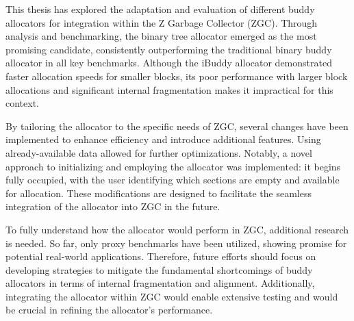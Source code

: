 This thesis has explored the adaptation and evaluation of different buddy allocators for integration within the Z Garbage Collector (ZGC). Through analysis and benchmarking, the binary tree allocator emerged as the most promising candidate, consistently outperforming the traditional binary buddy allocator in all key benchmarks. Although the iBuddy allocator demonstrated faster allocation speeds for smaller blocks, its poor performance with larger block allocations and significant internal fragmentation makes it impractical for this context.

By tailoring the allocator to the specific needs of ZGC, several changes have been implemented to enhance efficiency and introduce additional features. Using already-available data allowed for further optimizations. Notably, a novel approach to initializing and employing the allocator was implemented: it begins fully occupied, with the user identifying which sections are empty and available for allocation. These modifications are designed to facilitate the seamless integration of the allocator into ZGC in the future.

To fully understand how the allocator would perform in ZGC, additional research is needed. So far, only proxy benchmarks have been utilized, showing promise for potential real-world applications. Therefore, future efforts should focus on developing strategies to mitigate the fundamental shortcomings of buddy allocators in terms of internal fragmentation and alignment. Additionally, integrating the allocator within ZGC would enable extensive testing and would be crucial in refining the allocator's performance.

